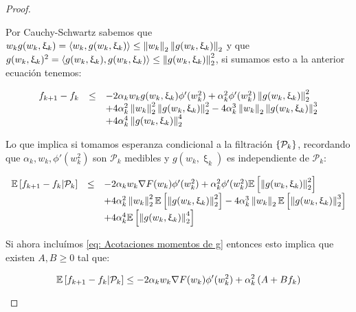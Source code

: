 \begin{proof}
\begin{enumerate}
		
		Por Cauchy-Schwartz sabemos que $w_k g(w_k, \upxi_{k}) = \left\langle w_k, g(w_k, \upxi_{k})\right\rangle \leq \left\lVert w_k\right\rVert_2 \left\lVert g(w_k, \upxi_{k})\right\rVert_2$ y que $g(w_k, \upxi_{k})^2 = \left\langle g(w_k, \upxi_{k}), g(w_k, \upxi_{k})\right\rangle \leq \left\lVert g(w_k, \upxi_{k})\right\rVert_2^2$, si sumamos esto a la anterior ecuaci\'on tenemos:
		
		\begin{equation*}
		\begin{array}{rcl}
		f_{k+1} - f_k & \leq & -2 \alpha_k w_k g(w_k, \upxi_{k}) \phi'(w_k^2)  + \alpha_k^2 \phi'(w_k^2) \left\lVert g(w_k, \upxi_{k})\right\rVert_2^2 \\ 
		& & + 4 \alpha_k^2 \left\lVert w_k\right\rVert_2^2 \left\lVert g(w_k, \upxi_{k})\right\rVert_2^2 -4 \alpha_k^3 \left\lVert w_k\right\rVert_2 \left\lVert g(w_k, \upxi_{k})\right\rVert_2^3  \\
		& & + 4 \alpha_k^4 \left\lVert g(w_k, \upxi_{k})\right\rVert_2^4 \\
		\end{array}
		\end{equation*}
		
		Lo que implica si tomamos esperanza condicional a la filtraci\'on $\left\lbrace\mathcal{P}_k\right\rbrace$, recordando que $\alpha_k, w_k, \phi'(w_k^2)$ son $\mathcal{P}_k$ medibles y $g(w_k, \upxi_{k})$ es independiente de $\mathcal{P}_k$:
		
		\begin{equation*}
		\begin{array}{rcl}
		\mathbb{E} \left[{f_{k+1} - f_k} \vert \mathcal{P}_{k}\right] & \leq & -2 \alpha_k w_k \nabla F (w_k)\phi'(w_k^2)  + \alpha_k^2 \phi'(w_k^2) \mathbb{E} \left[\left\lVert g(w_k, \upxi_{k})\right\rVert_2^2\right] \\ 
		& & + 4 \alpha_k^2 \left\lVert w_k\right\rVert_2^2 \mathbb{E} \left[\left\lVert g(w_k, \upxi_{k})\right\rVert_2^2\right] -4 \alpha_k^3 \left\lVert w_k\right\rVert_2 \mathbb{E} \left[\left\lVert g(w_k, \upxi_{k})\right\rVert_2^3\right]  \\
		& & + 4 \alpha_k^4 \mathbb{E} \left[\left\lVert g(w_k, \upxi_{k})\right\rVert_2^4\right] \\
		\end{array}
		\end{equation*}
		
		
		Si ahora inclu\'imos \ref{eq: Acotaciones momentos de g} entonces esto implica que existen $A,B \geq 0$ tal que:
		
		\begin{equation*}
		\mathbb{E} \left[{f_{k+1} - f_k} \vert \mathcal{P}_{k}\right] \leq -2 \alpha_k w_k \nabla F (w_k)\phi'(w_k^2)  + \alpha_k^2\left(A + B f_k\right)
		\end{equation*}
		

\end{enumerate}
\end{proof}

